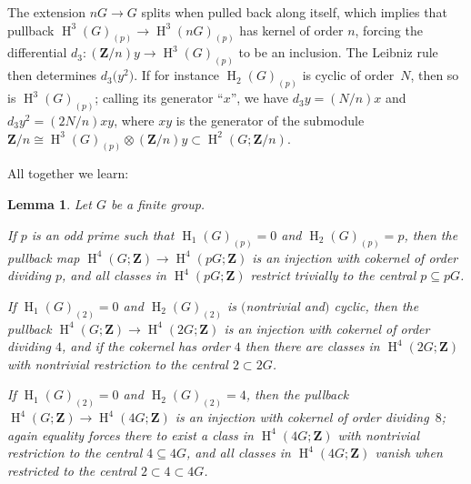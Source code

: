 \documentclass[pdftex]{sigma}
\numberwithin{equation}{section}
\newtheorem{Lemma}[Theorem]{Lemma}
\newcommand\bZ{\mathbf Z}
\DeclareMathOperator\homology{H}
\renewcommand\H{\homology}
\newcommand\<\langle
\renewcommand\>\rangle
\begin{document}
The extension $nG \to G$ splits when pulled back along itself, which implies that pullback $\H^3(G)_{(p)} \to \H^3(nG)_{(p)}$ has kernel of order $n$, forcing the differential $d_3\colon (\bZ/n)y \to \H^3(G)_{(p)}$ to be an inclusion.
The Leibniz rule then determines $d_3\big(y^2\big)$. If for instance $\H_2(G)_{(p)}$ is cyclic of order~$N$, then so is $\H^3(G)_{(p)}$; calling its generator ``$x$'', we have $d_3 y = (N/n)x$ and $d_3 y^2 = (2N/n)xy$, where $xy$ is the generator of the submodule $\bZ/n \cong \H^3(G)_{(p)} \otimes (\bZ/n)y \subset \H^2(G;\bZ/n)$.

All together we learn:

\begin{Lemma}\label{lemma:schur cover} Let $G$ be a finite group.

If $p$ is an odd prime such that $\H_1(G)_{(p)} = 0$ and $\H_2(G)_{(p)} = p$, then the pullback map $\H^4(G;\bZ) \to \H^4(pG;\bZ)$ is an injection with cokernel of order dividing $p$, and all classes in $\H^4(pG;\bZ)$ restrict trivially to the central $p \subseteq pG$.

If $\H_1(G)_{(2)} = 0$ and $\H_2(G)_{(2)}$ is $($nontrivial and$)$ cyclic, then the pullback $\H^4(G;\bZ) \to \H^4(2G;\bZ)$ is an injection with cokernel of order dividing $4$, and if the cokernel has order $4$ then there are classes in $\H^4(2G;\bZ)$ with nontrivial restriction to the central $2 \subset 2G$.

If $\H_1(G)_{(2)} = 0$ and $\H_2(G)_{(2)} = 4$, then the pullback $\H^4(G;\bZ) \to \H^4(4G;\bZ)$ is an injection with cokernel of order dividing~$8$; again equality forces there to exist a class in $\H^4(4G;\bZ)$ with nontrivial restriction to the central $4\subseteq 4G$, and all classes in $\H^4(4G;\bZ)$ vanish when restricted to the central $2 \subset 4 \subset 4G$.
\end{Lemma}
\end{document}
